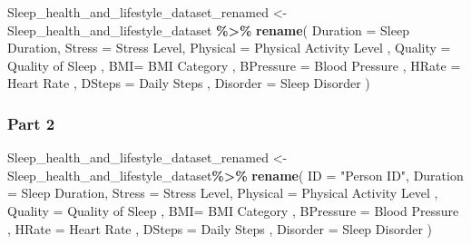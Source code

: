 \documentclass[
  11pt,
]{article}
\newenvironment{Shaded}{\begin{snugshade}}{\end{snugshade}}
\newcommand{\AttributeTok}[1]{\textcolor[rgb]{0.13,0.29,0.53}{#1}}
\newcommand{\FunctionTok}[1]{\textcolor[rgb]{0.13,0.29,0.53}{\textbf{#1}}}
\newcommand{\NormalTok}[1]{#1}
\newcommand{\OtherTok}[1]{\textcolor[rgb]{0.56,0.35,0.01}{#1}}
\newcommand{\SpecialCharTok}[1]{\textcolor[rgb]{0.81,0.36,0.00}{\textbf{#1}}}
\newcommand{\StringTok}[1]{\textcolor[rgb]{0.31,0.60,0.02}{#1}}
\begin{document}
\begin{Shaded}
\begin{Highlighting}[]
\NormalTok{Sleep\_health\_and\_lifestyle\_dataset\_renamed }\OtherTok{\textless{}{-}}\NormalTok{ Sleep\_health\_and\_lifestyle\_dataset }\SpecialCharTok{\%\textgreater{}\%}
  \FunctionTok{rename}\NormalTok{( }\AttributeTok{Duration =} \StringTok{\textquotesingle{}Sleep Duration\textquotesingle{}}\NormalTok{,}
          \AttributeTok{Stress =} \StringTok{\textquotesingle{}Stress Level\textquotesingle{}}\NormalTok{,}
          \AttributeTok{Physical =} \StringTok{\textquotesingle{}Physical Activity Level\textquotesingle{}}\NormalTok{ ,}
          \AttributeTok{Quality =} \StringTok{\textquotesingle{}Quality of Sleep\textquotesingle{}}\NormalTok{ ,}
          \AttributeTok{BMI=} \StringTok{\textquotesingle{}BMI Category\textquotesingle{}}\NormalTok{ ,}
          \AttributeTok{BPressure =} \StringTok{\textquotesingle{}Blood Pressure\textquotesingle{}}\NormalTok{ ,}
          \AttributeTok{HRate =} \StringTok{\textquotesingle{}Heart Rate\textquotesingle{}}\NormalTok{ ,}
          \AttributeTok{DSteps =} \StringTok{\textquotesingle{}Daily Steps\textquotesingle{}}\NormalTok{ ,}
          \AttributeTok{Disorder =} \StringTok{\textquotesingle{}Sleep Disorder\textquotesingle{}}\NormalTok{ )}
\end{Highlighting}
\end{Shaded}

\hypertarget{part-2}{%
\subsubsection{Part 2}\label{part-2}}

\begin{Shaded}
\begin{Highlighting}[]
\NormalTok{Sleep\_health\_and\_lifestyle\_dataset\_renamed }\OtherTok{\textless{}{-}}\NormalTok{ Sleep\_health\_and\_lifestyle\_dataset}\SpecialCharTok{\%\textgreater{}\%}
  \FunctionTok{rename}\NormalTok{( }\AttributeTok{ID =} \StringTok{"Person ID"}\NormalTok{,}
          \AttributeTok{Duration =} \StringTok{\textquotesingle{}Sleep Duration\textquotesingle{}}\NormalTok{,}
          \AttributeTok{Stress =} \StringTok{\textquotesingle{}Stress Level\textquotesingle{}}\NormalTok{,}
          \AttributeTok{Physical =} \StringTok{\textquotesingle{}Physical Activity Level\textquotesingle{}}\NormalTok{ ,}
          \AttributeTok{Quality =} \StringTok{\textquotesingle{}Quality of Sleep\textquotesingle{}}\NormalTok{ ,}
          \AttributeTok{BMI=} \StringTok{\textquotesingle{}BMI Category\textquotesingle{}}\NormalTok{ ,}
          \AttributeTok{BPressure =} \StringTok{\textquotesingle{}Blood Pressure\textquotesingle{}}\NormalTok{ ,}
          \AttributeTok{HRate =} \StringTok{\textquotesingle{}Heart Rate\textquotesingle{}}\NormalTok{ ,}
          \AttributeTok{DSteps =} \StringTok{\textquotesingle{}Daily Steps\textquotesingle{}}\NormalTok{ ,}
          \AttributeTok{Disorder =} \StringTok{\textquotesingle{}Sleep Disorder\textquotesingle{}}\NormalTok{ )}
\end{Highlighting}
\end{Shaded}
\end{document}
